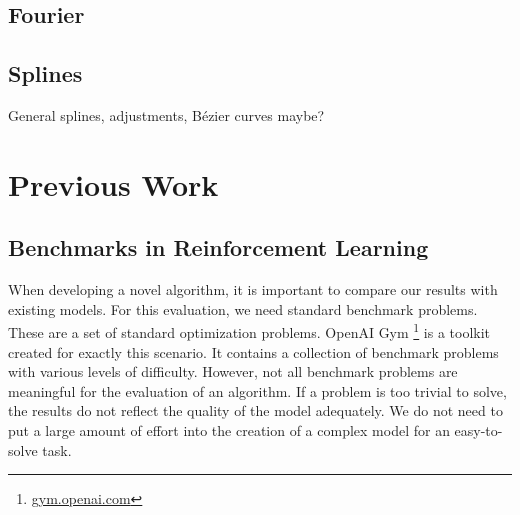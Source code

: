 \subsection{Fourier}

\subsection{Splines}
General splines, adjustments, Bézier curves maybe? 


\section{Previous Work}

\subsection{Benchmarks in Reinforcement Learning}
\label{ssec:benchmarks}
When developing a novel algorithm, it is important to compare our results with existing models. For this evaluation, we need standard benchmark problems. These are a set of standard optimization problems. OpenAI Gym \footnote{\url{gym.openai.com}} is a toolkit created for exactly this scenario. It contains a collection of benchmark problems with various levels of difficulty. However, not all benchmark problems are meaningful for the evaluation of an algorithm. If a problem is too trivial to solve, the results do not reflect the quality of the model adequately. We do not need to put a large amount of effort into the creation of a complex model for an easy-to-solve task.

